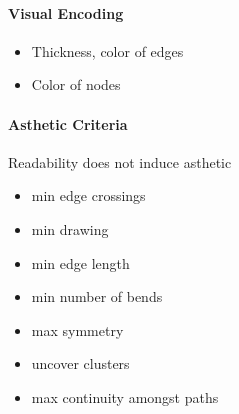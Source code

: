 \documentclass[10pt,a4paper]{article}
\begin{document}
	\paragraph{Visual Encoding}
	\begin{itemize}
		\item Thickness, color of edges
		\item Color of nodes
	\end{itemize}
	
	\paragraph{Asthetic Criteria}
	Readability does not induce asthetic
	\begin{itemize}
		\item min edge crossings
		\item min drawing
		\item min edge length
		\item min number of bends
		\item max symmetry
		\item uncover clusters
		\item max continuity amongst paths
	\end{itemize}
	
\end{document}
